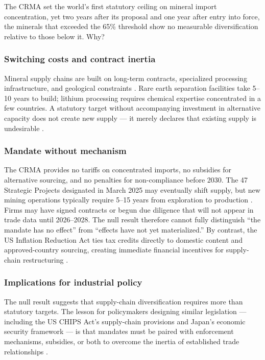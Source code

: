 \documentclass[12pt]{article}
\begin{document}
The CRMA set the world's first statutory ceiling on mineral import concentration, yet two years after its proposal and one year after entry into force, the minerals that exceeded the 65\% threshold show no measurable diversification relative to those below it. Why?

\subsubsection*{Switching costs and contract inertia} Mineral supply chains are built on long-term contracts, specialized processing infrastructure, and geological constraints \citep{barrot2016input}. Rare earth separation facilities take 5--10 years to build; lithium processing requires chemical expertise concentrated in a few countries. A statutory target without accompanying investment in alternative capacity does not create new supply --- it merely declares that existing supply is undesirable \citep{iea2023critical}.

\subsubsection*{Mandate without mechanism} The CRMA provides no tariffs on concentrated imports, no subsidies for alternative sourcing, and no penalties for non-compliance before 2030. The 47 Strategic Projects designated in March 2025 may eventually shift supply, but new mining operations typically require 5--15 years from exploration to production \citep{iea2023critical}. Firms may have signed contracts or begun due diligence that will not appear in trade data until 2026--2028. The null result therefore cannot fully distinguish ``the mandate has no effect'' from ``effects have not yet materialized.'' By contrast, the US Inflation Reduction Act ties tax credits directly to domestic content and approved-country sourcing, creating immediate financial incentives for supply-chain restructuring \citep{bown2022chips}.

\subsubsection*{Implications for industrial policy} The null result suggests that supply-chain diversification requires more than statutory targets. The lesson for policymakers designing similar legislation --- including the US CHIPS Act's supply-chain provisions and Japan's economic security framework --- is that mandates must be paired with enforcement mechanisms, subsidies, or both to overcome the inertia of established trade relationships \citep{evenett2022trade}.
\end{document}

